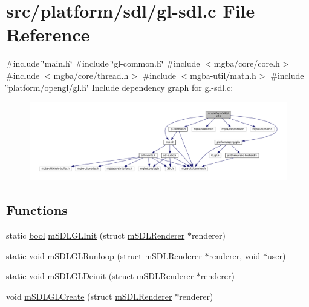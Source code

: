 \hypertarget{gl-sdl_8c}{}\section{src/platform/sdl/gl-\/sdl.c File Reference}
\label{gl-sdl_8c}
{\ttfamily \#include \char`\"{}main.\+h\char`\"{}}\newline
{\ttfamily \#include \char`\"{}gl-\/common.\+h\char`\"{}}\newline
{\ttfamily \#include $<$mgba/core/core.\+h$>$}\newline
{\ttfamily \#include $<$mgba/core/thread.\+h$>$}\newline
{\ttfamily \#include $<$mgba-\/util/math.\+h$>$}\newline
{\ttfamily \#include \char`\"{}platform/opengl/gl.\+h\char`\"{}}\newline
Include dependency graph for gl-\/sdl.c\+:
\nopagebreak
\begin{figure}[H]
\begin{center}
\leavevmode
\includegraphics[width=350pt]{gl-sdl_8c__incl}
\end{center}
\end{figure}
\subsection*{Functions}
\begin{DoxyCompactItemize}
\item 
static \mbox{\hyperlink{libretro_8h_a4a26dcae73fb7e1528214a068aca317e}{bool}} \mbox{\hyperlink{gl-sdl_8c_a59b282969b17f19eff20d0fa9946867a}{m\+S\+D\+L\+G\+L\+Init}} (struct \mbox{\hyperlink{structm_s_d_l_renderer}{m\+S\+D\+L\+Renderer}} $\ast$renderer)
\item 
static void \mbox{\hyperlink{gl-sdl_8c_afe005d63d3605a9049c0aa730ad071b4}{m\+S\+D\+L\+G\+L\+Runloop}} (struct \mbox{\hyperlink{structm_s_d_l_renderer}{m\+S\+D\+L\+Renderer}} $\ast$renderer, void $\ast$user)
\item 
static void \mbox{\hyperlink{gl-sdl_8c_a0752bf9d71fd545b20003352ac4d36c9}{m\+S\+D\+L\+G\+L\+Deinit}} (struct \mbox{\hyperlink{structm_s_d_l_renderer}{m\+S\+D\+L\+Renderer}} $\ast$renderer)
\item 
void \mbox{\hyperlink{gl-sdl_8c_ad4bc3fc9cf378ca00da7328b0364161a}{m\+S\+D\+L\+G\+L\+Create}} (struct \mbox{\hyperlink{structm_s_d_l_renderer}{m\+S\+D\+L\+Renderer}} $\ast$renderer)
\end{DoxyCompactItemize}



